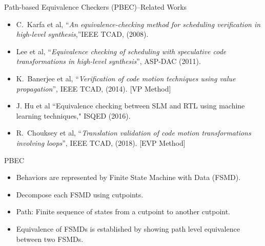 \begin{frame}{Path-based Equivalence Checkers (PBEC)--Related Works}
\begin{itemize}
\item C.~Karfa et al, ``\textit{An equivalence-checking method
    for scheduling verification in high-level synthesis},''IEEE TCAD, (2008).
\item Lee et al, ``\textit{Equivalence checking of scheduling with speculative code transformations in high-level 
    synthesis}'', ASP-DAC (2011).
\item K.~Banerjee et al, ``\textit{Verification of code
      motion techniques using value propagation}'', IEEE TCAD, (2014). {\color{blue}[VP Method]}
\item J. Hu et al ``Equivalence checking between SLM and RTL
using machine learning techniques," ISQED (2016).
\item R.~Chouksey et al, ``\textit{Translation validation of code motion
transformations involving loops}'', IEEE TCAD, (2018). {\color{blue}[EVP Method]}
\end{itemize}
\end{frame}
\begin{frame}{PBEC}
\begin{itemize}
\item Behaviors are represented by {\color{blue} Finite State Machine with Data (FSMD)}. 
\item Decompose each FSMD using {\color{blue} cutpoints}.
\item {\color{blue}Path}: Finite sequence of states from a cutpoint to another cutpoint.
\item {\color{blue}Equivalence of FSMDs} is established by showing path level equivalence between two FSMDs.
\end{itemize}
\end{frame}


